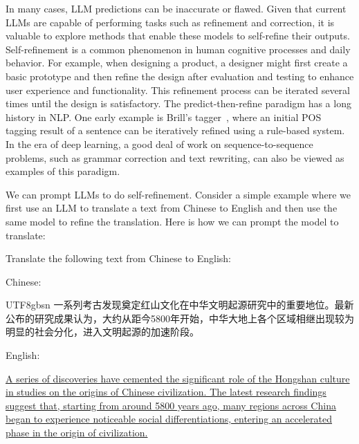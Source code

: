 \noindent In many cases, LLM predictions can be inaccurate or flawed. Given that current LLMs are capable of performing tasks such as refinement and correction, it is valuable to explore methods that enable these models to self-refine their outputs. Self-refinement is a common phenomenon in human cognitive processes and daily behavior. For example, when designing a product, a designer might first create a basic prototype and then refine the design after evaluation and testing to enhance user experience and functionality. This refinement process can be iterated several times until the design is satisfactory. The predict-then-refine paradigm has a long history in NLP. One early example is Brill's tagger~\cite{brill:1992simple}, where an initial POS tagging result of a sentence can be iteratively refined using a rule-based system. In the era of deep learning, a good deal of work on sequence-to-sequence problems, such as grammar correction and text rewriting, can also be viewed as examples of this paradigm.

We can prompt LLMs to do self-refinement. Consider a simple example where we first use an LLM to translate a text from Chinese to English and then use the same model to refine the translation. Here is how we can prompt the model to translate:

\vspace{0.5em}
\begin{tcolorbox}

\begingroup
\setlength{\leftskip}{2em}
\setlength{\rightskip}{2em}

Translate the following text from Chinese to English:

\vspace{0.5em}

Chinese:

\vspace{0.2em}

\begin{CJK*}{UTF8}{gbsn}
一系列考古发现奠定红山文化在中华文明起源研究中的重要地位。最新公布的研究成果认为，大约从距今5800年开始，中华大地上各个区域相继出现较为明显的社会分化，进入文明起源的加速阶段。
\end{CJK*}

\vspace{0.5em}

English:

\vspace{0.2em}

\uline{A series of discoveries have cemented the significant role of the Hongshan culture in studies on the origins of Chinese civilization. The latest research findings suggest that, starting from around 5800 years ago, many regions across China began to experience noticeable social differentiations, entering an accelerated phase in the origin of civilization.}

\endgroup

\end{tcolorbox}
\vspace{0.5em}

